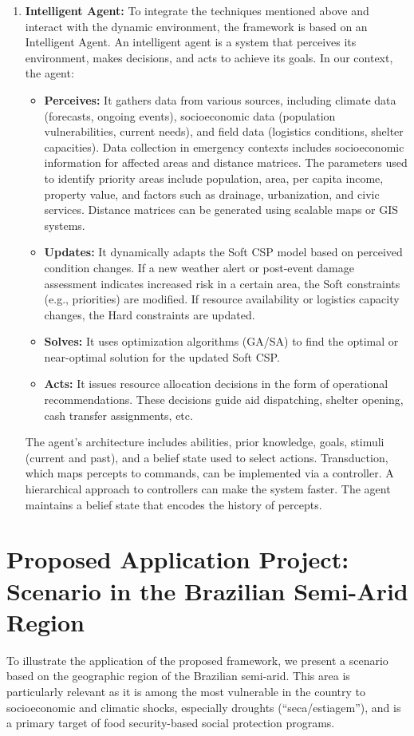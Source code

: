 \begin{enumerate}
    \item \textbf{Intelligent Agent:} To integrate the techniques mentioned above and interact with the dynamic environment, the framework is based on an Intelligent Agent. An intelligent agent is a system that perceives its environment, makes decisions, and acts to achieve its goals. In our context, the agent:
    \begin{itemize}
        \item \textbf{Perceives:} It gathers data from various sources, including climate data (forecasts, ongoing events), socioeconomic data (population vulnerabilities, current needs), and field data (logistics conditions, shelter capacities). Data collection in emergency contexts includes socioeconomic information for affected areas and distance matrices. The parameters used to identify priority areas include population, area, per capita income, property value, and factors such as drainage, urbanization, and civic services. Distance matrices can be generated using scalable maps or GIS systems.
        \item \textbf{Updates:} It dynamically adapts the Soft CSP model based on perceived condition changes. If a new weather alert or post-event damage assessment indicates increased risk in a certain area, the Soft constraints (e.g., priorities) are modified. If resource availability or logistics capacity changes, the Hard constraints are updated.
        \item \textbf{Solves:} It uses optimization algorithms (GA/SA) to find the optimal or near-optimal solution for the updated Soft CSP.
        \item \textbf{Acts:} It issues resource allocation decisions in the form of operational recommendations. These decisions guide aid dispatching, shelter opening, cash transfer assignments, etc.
    \end{itemize}
    The agent’s architecture includes abilities, prior knowledge, goals, stimuli (current and past), and a belief state used to select actions. Transduction, which maps percepts to commands, can be implemented via a controller. A hierarchical approach to controllers can make the system faster. The agent maintains a belief state that encodes the history of percepts.
\end{enumerate}

\section{Proposed Application Project: Scenario in the Brazilian Semi-Arid Region}
To illustrate the application of the proposed framework, we present a scenario based on the geographic region of the Brazilian semi-arid. This area is particularly relevant as it is among the most vulnerable in the country to socioeconomic and climatic shocks, especially droughts (``seca/estiagem''), and is a primary target of food security-based social protection programs.

